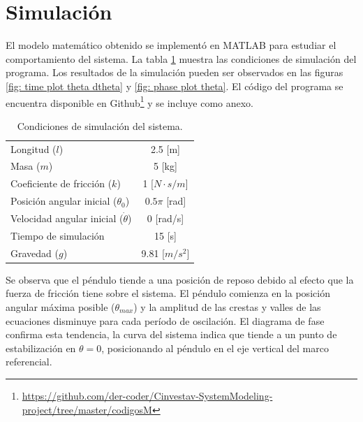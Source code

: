 \section{Simulación}

El modelo matemático obtenido se implementó en MATLAB 
para estudiar el comportamiento del sistema.
La tabla \ref{table: simulation conditions}
muestra las condiciones de simulación del programa.
Los resultados de la simulación pueden ser 
observados en las figuras \ref{fig: time plot theta dtheta}
 y \ref{fig: phase plot theta}. 
El código del programa se encuentra disponible en 
Github\footnote{\url{https://github.com/der-coder/Cinvestav-SystemModeling-project/tree/master/codigosM}}
y se incluye como anexo.

\begin{table}[hb]
 \begin{center}
\begin{tabular}{lc}
\hline
Longitud ($l$) & 2.5 [m] \\
Masa ($m$) & 5 [kg]\\
Coeficiente de fricción ($k$) & 1 [$N \cdot s / m$] \\
Posición angular inicial ($\theta_0$) & $0.5\pi$ [rad] \\
Velocidad angular inicial ($\dot{\theta}$) & 0 [rad/s] \\
Tiempo de simulación & 15 [s]  \\
Gravedad ($g$) & 9.81 [$m/s^2$]  \\
\hline
 \end{tabular}
 \end{center}
 \caption{Condiciones de simulación del sistema.}
\label{table: simulation conditions}
\end{table}


Se observa que el péndulo tiende a una posición de reposo debido
al efecto que la fuerza de fricción tiene sobre el sistema.
El péndulo comienza en la posición angular máxima posible 
($\theta_{max}$) y la amplitud de las crestas y valles de las 
ecuaciones disminuye para cada período de oscilación.
El diagrama de fase confirma esta tendencia, la curva del sistema
indica que tiende a un punto de estabilización en $\theta = 0$,
posicionando al péndulo en el eje vertical del marco referencial.

